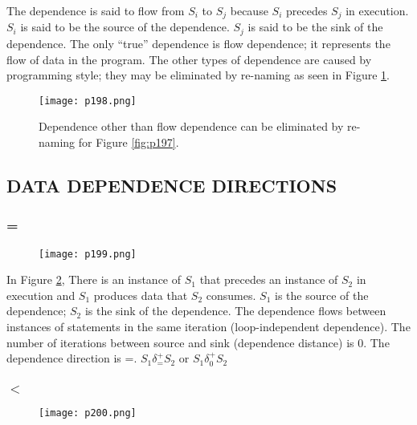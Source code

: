The dependence is said to flow from $S_i$ to $S_j$ because $S_i$
precedes $S_j$ in execution.
$S_i$ is said to be the source of the dependence. $S_j$ is said to
be the sink of the dependence.
The only “true” dependence is flow dependence; it
represents the flow of data in the program.
The other types of dependence are caused by programming
style; they may be eliminated by re-naming as seen in Figure \ref{fig:p198}.


\begin{figure}[H]
	\centering
	\texttt{[image: p198.png]}
	\caption{Dependence other than flow dependence can be eliminated by re-naming for Figure \ref{fig:p197}.}
	\label{fig:p198}
\end{figure}



\subsection{DATA DEPENDENCE DIRECTIONS}

\subsubsection{ = }

\begin{figure}[H]
	\centering
	\texttt{[image: p199.png]}
	\caption{}
	\label{fig:p199}
\end{figure}


In Figure \ref{fig:p199}, There is an instance of $S_1$ that precedes an instance of $S_2$ in
execution and $S_1$ produces data that $S_2$ consumes.
$S_1$ is the {\color{red}source} of the dependence; $S_2$ is the {\color{red}sink} of the
dependence.
The dependence flows between instances of statements in the
same iteration ({\color{red}loop-independent} dependence).
The number of iterations between source and sink (dependence
distance) is 0. The {\color{red}dependence direction} is {\color{red}=}.
$S_1 \delta^{+}_{=} S_2$ or $S_1 \delta^{+}_{0} S_2$

\subsubsection{$<$}

\begin{figure}[H]
	\centering
	\texttt{[image: p200.png]}
	\caption{}
	\label{fig:p200}
\end{figure}

